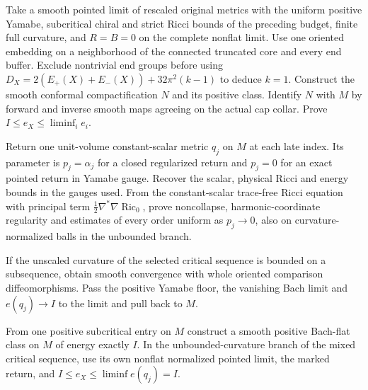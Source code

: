 \begin{openproblem}
\label{prop:ed05-bour-pointed}
Take a smooth pointed limit of rescaled original metrics with the uniform
positive Yamabe, subcritical chiral and strict Ricci bounds of the preceding
budget, finite full curvature, and $R=B=0$ on the complete nonflat limit.
Use one oriented embedding on a neighborhood of the connected truncated
core and every end buffer. Exclude nontrivial end groups before using
$D_X=2(E_+(X)+E_-(X))+32\pi^2(k-1)$ to deduce $k=1$.
Construct the smooth conformal compactification $N$ and its positive
class. Identify $N$ with $M$ by forward and inverse smooth maps
agreeing on the actual cap collar. Prove $I\le e_X\le\liminf_i e_i$.
\end{openproblem}

\begin{openproblem}
\label{prop:ed05-bour-stationary}
Return one unit-volume constant-scalar metric $q_j$ on $M$ at each late
index. Its parameter is $p_j=\alpha_j$ for a closed regularized return
and $p_j=0$ for an exact pointed return in Yamabe gauge.
Recover the scalar, physical Ricci and energy bounds in the gauges used.
From the constant-scalar trace-free Ricci equation with principal term
$\tfrac12\nabla^*\nabla\operatorname{Ric}_0$, prove noncollapse,
harmonic-coordinate regularity and estimates of every order uniform
as $p_j\to0$, also on curvature-normalized balls in the unbounded branch.
\end{openproblem}

\begin{openproblem}
\label{prop:ed05-bour-closed}
If the unscaled curvature of the selected critical sequence is bounded
on a subsequence, obtain smooth convergence with whole oriented
comparison diffeomorphisms. Pass the positive Yamabe floor, the
vanishing Bach limit and $e(q_j)\to I$ to the limit and pull back to $M$.
\end{openproblem}

\begin{openproblem}
\label{thm:ed05-bour-attainment}
From one positive subcritical entry on $M$ construct a smooth positive
Bach-flat class on $M$ of energy exactly $I$. In the unbounded-curvature
branch of the mixed critical sequence, use its own nonflat normalized
pointed limit, the marked return, and $I\le e_X\le\liminf e(q_j)=I$.
\end{openproblem}


